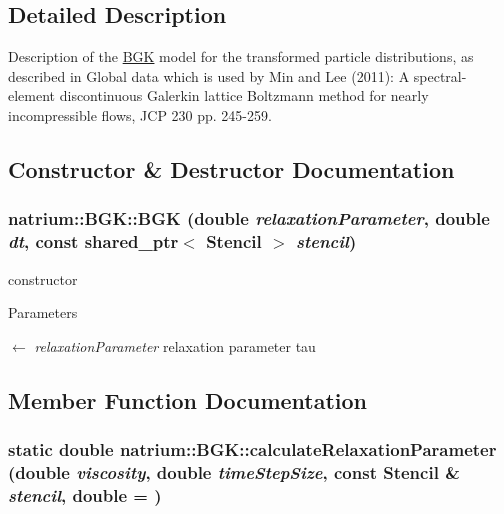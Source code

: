 \subsection{Detailed Description}
Description of the \hyperlink{classnatrium_1_1BGK}{BGK} model for the transformed particle distributions, as described in Global data which is used by Min and Lee (2011): A spectral-\/element discontinuous Galerkin lattice Boltzmann method for nearly incompressible flows, JCP 230 pp. 245-\/259. 

\subsection{Constructor \& Destructor Documentation}
\hypertarget{classnatrium_1_1BGK_acb5fcbbec625b60d7f2db05e9e66fbaa}{
\subsubsection[{BGK}]{\setlength{\rightskip}{0pt plus 5cm}natrium::BGK::BGK (double {\em relaxationParameter}, \/  double {\em dt}, \/  const shared\_\-ptr$<$ {\bf Stencil} $>$ {\em stencil})}}
\label{classnatrium_1_1BGK_acb5fcbbec625b60d7f2db05e9e66fbaa}


constructor 
\begin{DoxyParams}{Parameters}
\item[\mbox{$\leftarrow$} {\em relaxationParameter}]relaxation parameter tau \end{DoxyParams}


\subsection{Member Function Documentation}
\hypertarget{classnatrium_1_1BGK_a430f5020b6101a64d89a0cc2a246260e}{
\subsubsection[{calculateRelaxationParameter}]{\setlength{\rightskip}{0pt plus 5cm}static double natrium::BGK::calculateRelaxationParameter (double {\em viscosity}, \/  double {\em timeStepSize}, \/  const {\bf Stencil} \& {\em stencil}, \/  double = {})}}
\label{classnatrium_1_1BGK_a430f5020b6101a64d89a0cc2a246260e}


